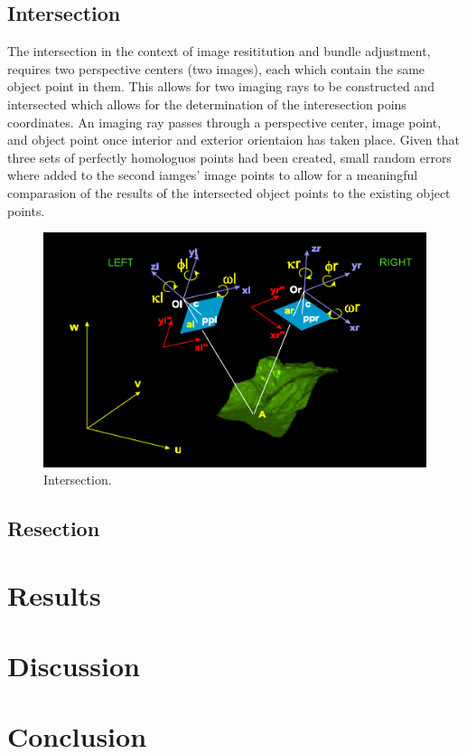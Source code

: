 \documentclass{article}
\begin{document}
\subsection{Intersection}
The intersection in the context of image resititution and bundle adjustment, requires two perspective centers (two images),
each which contain the same object point in them.
This allows for two imaging rays to be constructed and intersected which allows for the determination of the interesection poins coordinates.
An imaging ray passes through a perspective center, image point, and object point once interior and exterior orientaion has taken place.
Given that three sets of perfectly homologuos points had been created, small random errors where added to the second iamges' image points
to allow for a meaningful comparasion of the results of the intersected object points to the existing object points.

\begin{figure}[h!]
\centering
\caption{Intersection.}
\includegraphics[scale=0.2]{intersection}
\end{figure}


\subsection{Resection}



\section{Results}

\section{Discussion}

\section{Conclusion}
\end{document}
